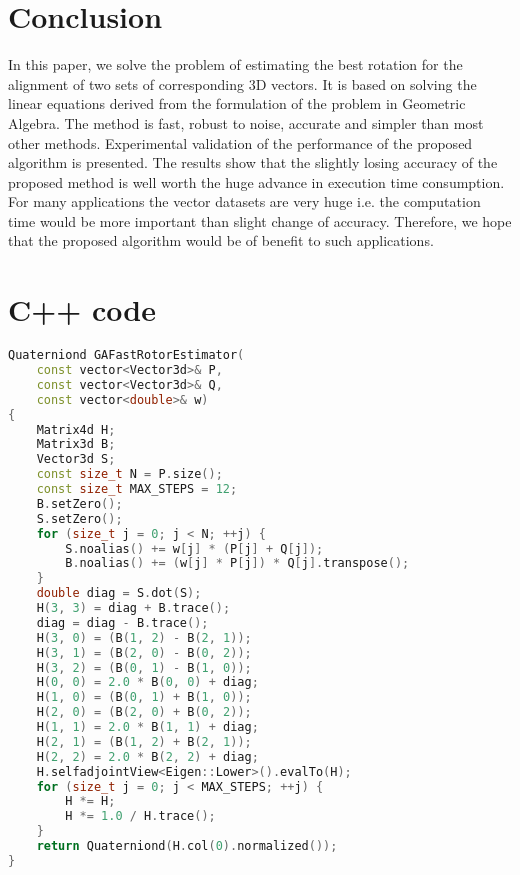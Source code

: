 \documentclass{birkjour}
\numberwithin{equation}{section}
\begin{document}

\section{Conclusion}
In this paper, we solve the problem of estimating the best rotation for the alignment of two sets of corresponding 3D vectors. It is based on solving the linear equations derived from the formulation of the problem in Geometric Algebra. The method is fast, robust to noise, accurate and simpler than most other methods. Experimental validation of the performance of the proposed algorithm is presented. The results show that the slightly losing accuracy of the proposed method is well worth the huge advance in execution time consumption. For many applications the vector datasets are very huge i.e. the computation time would be more important than slight change of accuracy. Therefore, we hope that the proposed algorithm would be of benefit to such applications.


\section{C++ code}

\begin{lstlisting}[language=C++, caption=C++ code for rotor estimation, basicstyle=\tiny, keywordstyle=\bfseries, label=lst:cppcode, morekeywords={Matrix4d,Matrix3d,Vector4d,Vector3d,Quaterniond,sqrt,__m256d,__m128d}]
Quaterniond GAFastRotorEstimator(
    const vector<Vector3d>& P, 
    const vector<Vector3d>& Q, 
    const vector<double>& w)
{
    Matrix4d H;
    Matrix3d B;
    Vector3d S;
    const size_t N = P.size();
    const size_t MAX_STEPS = 12;
    B.setZero();
    S.setZero();
    for (size_t j = 0; j < N; ++j) {
        S.noalias() += w[j] * (P[j] + Q[j]);
        B.noalias() += (w[j] * P[j]) * Q[j].transpose();
    }
    double diag = S.dot(S);
    H(3, 3) = diag + B.trace(); 
    diag = diag - B.trace();
    H(3, 0) = (B(1, 2) - B(2, 1));
    H(3, 1) = (B(2, 0) - B(0, 2));
    H(3, 2) = (B(0, 1) - B(1, 0));
    H(0, 0) = 2.0 * B(0, 0) + diag;
    H(1, 0) = (B(0, 1) + B(1, 0)); 
    H(2, 0) = (B(2, 0) + B(0, 2));
    H(1, 1) = 2.0 * B(1, 1) + diag; 
    H(2, 1) = (B(1, 2) + B(2, 1));
    H(2, 2) = 2.0 * B(2, 2) + diag;
    H.selfadjointView<Eigen::Lower>().evalTo(H);
    for (size_t j = 0; j < MAX_STEPS; ++j) {
        H *= H;
        H *= 1.0 / H.trace();
    }
    return Quaterniond(H.col(0).normalized());
}
\end{lstlisting}




\end{document}
